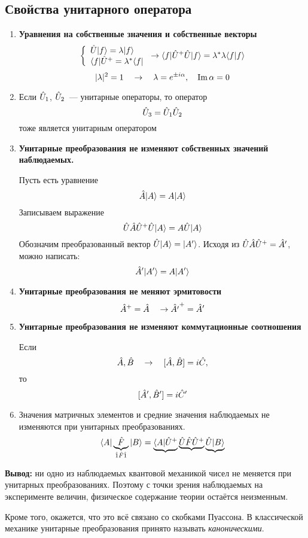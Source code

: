 \subsection{Свойства унитарного оператора}
\begin{enumerate}
  \item \textbf{Уравнения на собственные значения и собственные векторы}
  $$\left\{
  \begin{array}{l}
    \Hat U | f \rangle = \lambda | f \rangle \\
    \langle f | \Hat U^+ = \lambda^\ast \langle f |
  \end{array} \right.
    \to
  \langle f | \Hat U^+ \Hat U | f \rangle = \lambda^\ast \lambda \langle f | f \rangle
  $$
  $$
    |\lambda|^2 = 1 \quad \to \quad \lambda = e^{\pm i \alpha}, \quad \mathrm{Im} \, \alpha = 0
  $$
  \item Если $\Hat U_1$, $\Hat U_2$~--- унитарные операторы, то оператор
  $$
    \Hat U_3 = \Hat U_1 \Hat U_2
  $$
  тоже является унитарным оператором
  \item \textbf{Унитарные преобразования не изменяют собственных значений наблюдаемых.}

  Пусть есть уравнение
  $$
    \Hat A | A \rangle = A | A \rangle
  $$
  Записываем выражение
  $$
    \Hat U \Hat A \Hat U^+ \Hat U | A \rangle = A \Hat U | A \rangle
  $$
  Обозначим преобразованный вектор $\Hat U | A \rangle = | A' \rangle$.
  Исходя из $\Hat U \Hat A \Hat U^+ = \Hat A'$, можно написать:
  $$
    \Hat A' | A' \rangle = A | A' \rangle
  $$
  \item \textbf{Унитарные преобразования не меняют эрмитовости}
  $$
    \Hat A^+ = \Hat A \quad \to \Hat {A'}^+ = \Hat A'
  $$
  \item \textbf{Унитарные преобразования не изменяют коммутационные соотношения}

  Если
  $$
    \Hat A, \Hat B \quad \to \quad [\Hat A, \Hat B] = i \Hat C,
  $$
  то
  $$
    [\Hat A', \Hat B'] = i \Hat C'
  $$
  \item Значения матричных элементов и средние значения наблюдаемых не изменяются при унитарных преобразованиях.
      $$
        { \langle A |\underbrace{\Hat F}_{\Hat 1 \Hat F \Hat 1}| B \rangle } =
        \underbrace{\langle A | \Hat U^+} \underbrace{\Hat U \Hat F \Hat U^+} \underbrace{\Hat U | B \rangle}
      $$
\end{enumerate}
\textbf{Вывод:} ни одно из наблюдаемых квантовой механикой чисел не меняется при унитарных преобразованиях. Поэтому с точки зрения наблюдаемых на эксперименте величин, физическое содержание теории остаётся неизменным.

Кроме того, окажется, что это всё связано со скобками Пуассона. В классической механике унитарные преобразования принято называть \emph{каноническими}.

